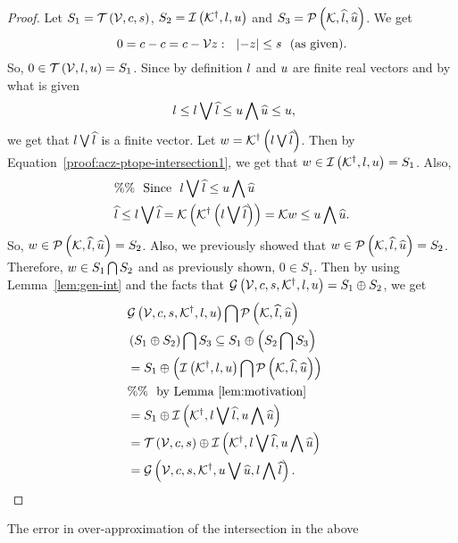 \begin{proof}
Let $S_1=\mathit{\operatorname{\mathcal{T}}}\left(\mathcal{V},c,s\right)$,
$S_2=\mathit{\operatorname{\mathcal{I}}}\left({\mathcal{K}}^\dagger,l,u\right)$ and
$S_3=\mathcal{P}\left(\mathcal{K},\widehat{l},\widehat{u}\right)$.  We get
%
\[
0=c-c=c-\mathcal{V} z:~~\left|-z\right|\leq s~~\text{(as given)}.
\]
%
So, $0\in \mathit{\operatorname{\mathcal{T}}}\left(\mathcal{V},l,u\right)=S_1$.  Since by definition $l$ and $u$ are finite real
vectors and by what is given
%
\begin{equation}~\label{proof:acz-ptope-intersection1}
  l\leq l\bigvee \widehat{l}\leq u\bigwedge \widehat{u}\leq u,
\end{equation}
%
 we get that $l\bigvee \widehat{l}$ is a finite vector.  Let
 $w={\mathcal{K}}^\dagger\left(l\bigvee \widehat{l}\right)$.  Then by Equation~\ref{proof:acz-ptope-intersection1},
 we get that $w\in\mathit{\operatorname{\mathcal{I}}}\left({\mathcal{K}}^\dagger,l,u\right)=S_1$.  Also,
%
 \begin{align*}
   &\%\%~~\text{Since}~~l\bigvee \widehat{l}\leq u\bigwedge \widehat{u}\\
& \widehat{l}\leq l\bigvee \widehat{l}=\mathcal{K}\left({\mathcal{K}}^\dagger\left(l\bigvee \widehat{l}\right)\right)=\mathcal{K}
w
\leq u\bigwedge \widehat{u}.
\end{align*}
%
So, $w\in\mathcal{P}\left(\mathcal{K},\widehat{l},\widehat{u}\right)=S_2$.  Also, we previously showed
that $w\in\mathcal{P}\left(\mathcal{K},\widehat{l},\widehat{u}\right)=S_2$.  Therefore, $w\in
S_1\bigcap S_2$ and as previously shown, $0\in S_1$.  Then by
using Lemma~\ref{lem:gen-int} and the facts that
$\mathcal{G}\left(\mathcal{V},c,s,{\mathcal{K}}^\dagger,l,u\right)=S_1\oplus S_2$,
we get
%
\begin{align*}
  & \mathcal{G}\left(\mathcal{V},c,s,{\mathcal{K}}^\dagger,l,u\right)\bigcap \mathcal{P}\left(\mathcal{K},\widehat{l},\widehat{u}\right)\\
&
  \left(S_1\oplus S_2\right)\bigcap S_3\subseteq S_1\oplus \left(S_2\bigcap S_3\right)\\
  & =
  S_1\oplus \left(\mathit{\operatorname{\mathcal{I}}}\left({\mathcal{K}}^\dagger,l,u\right)\bigcap \mathcal{P}\left(\mathcal{K},\widehat{l},\widehat{u}\right)\right)\\
  & \%\%~~\text{by Lemma~\ref{lem:motivation}}\\
  &
  = S_1\oplus \mathit{\operatorname{\mathcal{I}}}\left({\mathcal{K}}^\dagger,l\bigvee \widehat{l},u\bigwedge \widehat{u}\right)\\
  & =
  \mathit{\operatorname{\mathcal{T}}}\left(\mathcal{V},c,s\right)\oplus \mathit{\operatorname{\mathcal{I}}}\left({\mathcal{K}}^\dagger,l\bigvee \widehat{l},u\bigwedge \widehat{u}\right)\\
  & = \mathcal{G}\left(\mathcal{V},c,s,{\mathcal{K}}^\dagger,u\bigvee \widehat{u},l\bigwedge \widehat{l}\right).~~~~~~~~~~\qedhere
\end{align*}
%
\end{proof}
%
The error in over-approximation of the intersection in the above
